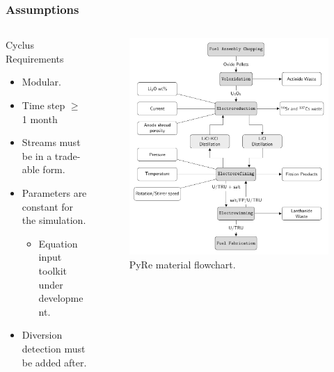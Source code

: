 \begin{frame}
\frametitle{Assumptions}
\begin{columns}
	\begin{column}{.45\textwidth}
		\begin{block}{Cyclus Requirements} 
			\begin{itemize}
				\item Modular.
				\item Time step $\geq$ 1 month
				\item Streams must be in a
				trade-able form.
				\item Parameters are constant for the simulation.
				\begin{itemize}
					\item Equation input toolkit under development.
				\end{itemize}
				\item Diversion detection must be added after.
			\end{itemize}
		\end{block}
	\end{column}
	\begin{column}{.55\textwidth}
		\begin{figure}
			\centering
			\includegraphics[width=0.9\linewidth]{flowchart}
			\caption{PyRe material flowchart.}
			\label{fig:cyclus}
		\end{figure}
	\end{column}
\end{columns} 
\end{frame}

